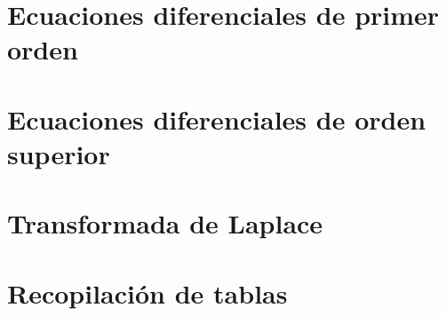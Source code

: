\documentclass{../summarie}
\begin{document}
\frontmatter

    \Portada 
    \tableofcontents

\mainmatter

    \onehalfspacing


    \chapter{Ecuaciones diferenciales de primer orden} 
    \chapter{Ecuaciones diferenciales de orden superior} 
    \chapter{Transformada de Laplace} 


\backmatter

\appendix

    \chapter{Recopilación de tablas}
        
        
        
        
        
        
\end{document}
